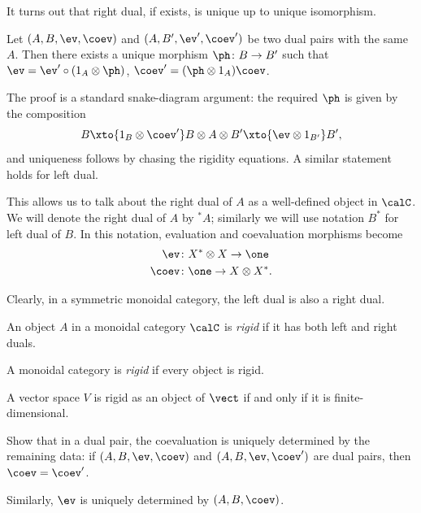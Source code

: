 It turns out that right dual, if exists, is unique up to unique isomorphism.
\begin{theorem}\label{t:dual_unique1}
  Let $(A, B, \ev, \coev)$ and $(A,B', \ev', \coev')$ be two dual pairs with
  the same $A$.
  Then there exists a unique morphism $\ph\colon B\to B'$ such that
  $\ev = \ev' \circ (1_A\otimes \ph)$,
  $\coev' =(\ph\otimes 1_A) \coev$.
\end{theorem}
The proof is a standard snake-diagram argument: the required $\ph$ is given by
the composition
$$
  B \xto{1_B\otimes \coev'} B\otimes A\otimes B'
    \xto{\ev\otimes 1_{B'}} B',
$$
and uniqueness follows by chasing the rigidity equations.
A similar statement holds for left dual.

This allows us to talk about the right dual of $A$ as a well-defined object in
$\calC$. We will denote the right dual of $A$ by ${}^*A$; similarly we will use
notation $B^*$ for left dual of $B$. In this notation, evaluation and
coevaluation morphisms become
\begin{equation}
  \begin{aligned}
    \ev&\colon X^*\otimes X\to\one\\
    \coev&\colon \one \to X\otimes X^*.
  \end{aligned}
\end{equation}

Clearly, in a symmetric monoidal
category, the left dual is also a right dual.

\begin{definition}\label{d:rigid}
  An object $A$ in a monoidal category $\calC$ is
  \emph{rigid} if
  it has both left and right duals.

  A monoidal category is \emph{rigid}
  if every object is rigid.
\end{definition}

\begin{example}\label{x:vector-rigid}
  A vector space $V$ is rigid as an object of $\vect$ if and only if it is
  finite-dimensional.
\end{example}


\begin{exercise}\label{ec:coev-unique}
  Show that in a dual pair, the coevaluation is uniquely determined by
  the remaining data: if $(A, B, \ev, \coev)$ and $(A,B, \ev, \coev')$
  are dual pairs, then $\coev = \coev'$.

  Similarly, $\ev$ is uniquely determined by $(A,B, \coev)$.
\end{exercise}

